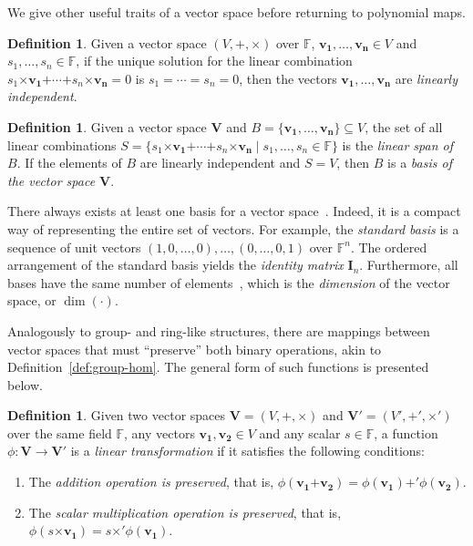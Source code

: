 \documentclass[12pt, a4paper, oneside]{memoir}
\theoremstyle{definition}
\newtheorem{definition}[theorem]{Definition}
\begin{document}
We give other useful traits of a vector space before returning to polynomial maps.

\begin{definition}
  Given a vector space $(V, \bm{+}, \bm{\times})$ over $\mathbb{F}$, $\mathbf{v_{1}}, \dots, \mathbf{v_{n}} \in V$ and $s_{1}, \dots, s_{n} \in \mathbb{F}$, if the unique solution for the linear combination $s_{1} \bm{\times} \mathbf{v_{1}} \bm{+} \cdots \bm{+} s_{n} \bm{\times} \mathbf{v_{n}} = 0$ is $s_{1} = \cdots = s_{n} = 0$, then the vectors $\mathbf{v_{1}}, \dots, \mathbf{v_{n}}$ are \emph{linearly independent}.
\end{definition}

\begin{definition}
  Given a vector space $\mathbf{V}$ and $B = \{\mathbf{v_{1}}, \dots, \mathbf{v_{n}}\} \subseteq V$, the set of all linear combinations $S = \{ s_{1} \bm{\times} \mathbf{v_{1}} \bm{+} \cdots \bm{+} s_{n} \bm{\times} \mathbf{v_{n}} \mid s_{1}, \dots, s_{n} \in \mathbb{F} \}$ is the \emph{linear span of $B$}. If the elements of $B$ are linearly independent and $S = V$, then $B$ is a \emph{basis of the vector space $\mathbf{V}$}.
\end{definition}

There always exists at least one basis for a vector space~\cite[p.~409, Prop.~1]{Dummit:2003}. Indeed, it is a compact way of representing the entire set of vectors. For example, the \emph{standard basis} is a sequence of unit vectors $(1, 0, \dots, 0), \dots, (0, \dots, 0, 1)$ over $\mathbb{F}^{n}$. The ordered arrangement of the standard basis yields the \emph{identity matrix} $\mathbf{I}_{n}$. Furthermore, all bases have the same number of elements~\cite[p.~411, Cor.~4]{Dummit:2003}, which is the \emph{dimension} of the vector space, or $\dim(\cdot)$.

Analogously to group- and ring-like structures, there are mappings between vector spaces that must ``preserve'' both binary operations, akin to Definition~\ref{def:group-hom}. The general form of such functions is presented below.

\begin{definition}
  Given two vector spaces $\mathbf{V} = (V, \bm{+}, \bm{\times})$ and $\mathbf{V'} = (V', \bm{+'}, \bm{\times'})$ over the same field $\mathbb{F}$, any vectors $\mathbf{v_{1}}, \mathbf{v_{2}} \in V$ and any scalar $s \in \mathbb{F}$, a function $\phi : \mathbf{V} \to \mathbf{V'}$ is a \emph{linear transformation} if it satisfies the following conditions:

  \begin{enumerate}
    \item The \emph{addition operation is preserved}, that is, $\phi(\mathbf{v_{1}} \bm{+} \mathbf{v_{2}}) = \phi(\mathbf{v_{1}}) \bm{+'} \phi(\mathbf{v_{2}})$.
    \item The \emph{scalar multiplication operation is preserved}, that is, $\phi(s \bm{\times} \mathbf{v_{1}}) = s \bm{\times'} \phi(\mathbf{v_{1}})$.
  \end{enumerate}
\end{definition}
\end{document}
